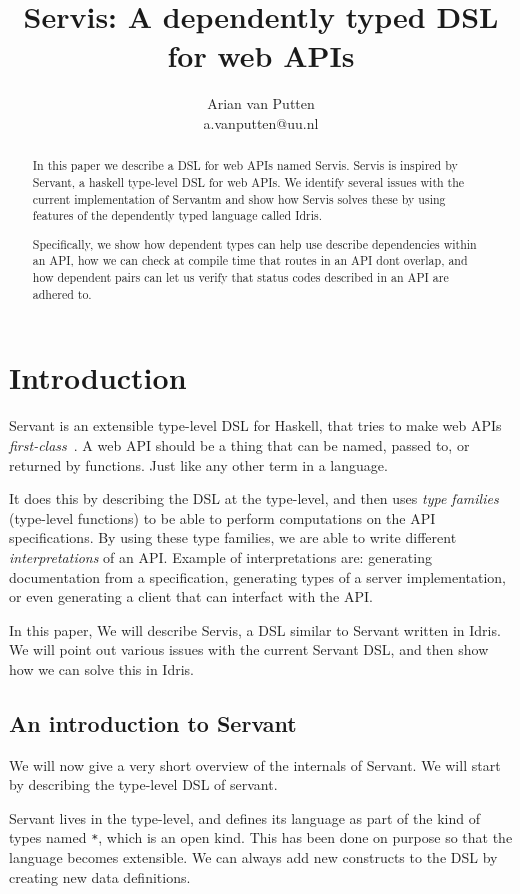 \documentclass[12pt,a4paper]{article}
\author{Arian van Putten \\ a.vanputten@uu.nl}
\title{Servis: A dependently typed DSL for web APIs}
\begin{document}
\maketitle
\begin{abstract}
In this paper we describe a DSL for web APIs named Servis. Servis is  inspired by Servant, a haskell type-level DSL for web APIs. We identify several issues with the current implementation of Servantm and show how Servis solves these by using features of the dependently typed language called Idris.

Specifically, we show how dependent types can help use describe dependencies within an API, how we can check at  compile time that routes in an API dont overlap, and how dependent pairs can let us verify that status codes described in an API are adhered to.

\end{abstract}

\section{Introduction}
Servant is an extensible type-level DSL for Haskell, that tries to make web APIs \emph{first-class}~\cite{servant}. A web API should be a thing that can be named, passed to, or returned by functions. Just like any other term in a language.

It does this by describing the DSL at the type-level, and then uses \emph{type families} (type-level functions) to be able to perform computations on the API specifications.  By using these type families, we are able to write different \emph{interpretations} of an API\@.  Example of interpretations are: generating documentation from a specification, generating types of a server implementation, or even generating a client that can interfact with the API\@.

In this paper, We will describe Servis, a DSL  similar to  Servant written in Idris. We will point out various issues with the current Servant DSL,
and then show how we can solve this in Idris.

\subsection{An introduction to Servant}
\label{sec:servant_intro}
We will now give a very short overview of the internals of Servant. We will start by describing the type-level DSL of servant.

Servant lives in the type-level, and defines its language as part of the kind of types named \texttt{*}, which is an open kind. This has been done on purpose so that the language becomes extensible. We can always add new constructs to the DSL by creating new data definitions.
\end{document}
